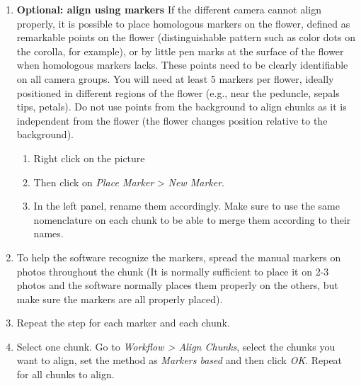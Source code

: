 \documentclass[10pt,letter,english]{article}
\begin{document}
\begin{enumerate}
    \item \textbf{Optional: align using markers} If the different camera cannot align properly, it is possible to place homologous markers on the flower, defined as remarkable points on the flower (distinguishable pattern such as color dots on the corolla, for example), or by little pen marks at the surface of the flower when homologous markers lacks. These points need to be clearly identifiable on all camera groups. You will need at least 5 markers per flower, ideally positioned in different regions of the flower (e.g., near the peduncle, sepals tips, petals). Do not use points from the background to align chunks as it is independent from the flower (the flower changes position relative to the background).
    \begin{enumerate}
        \item Right click on the picture
        \item Then click on \textit{Place Marker} > \textit{New Marker}.
        \item In the left panel, rename them accordingly. Make sure to use the same nomenclature on each chunk to be able to merge them according to their names.
    \end{enumerate}
    \item To help the software recognize the markers, spread the manual markers on photos throughout the chunk (It is normally sufficient to place it on 2-3 photos and the software normally places them properly on the others, but make sure the markers are all properly placed).
    \item Repeat the step for each marker and each chunk. 
    \item Select one chunk. Go to \textit{Workflow > Align Chunks}, select the chunks you want to align, set the method as \textit{Markers based} and then click \textit{OK}. Repeat for all chunks to align.



\end{enumerate}
\end{document}

